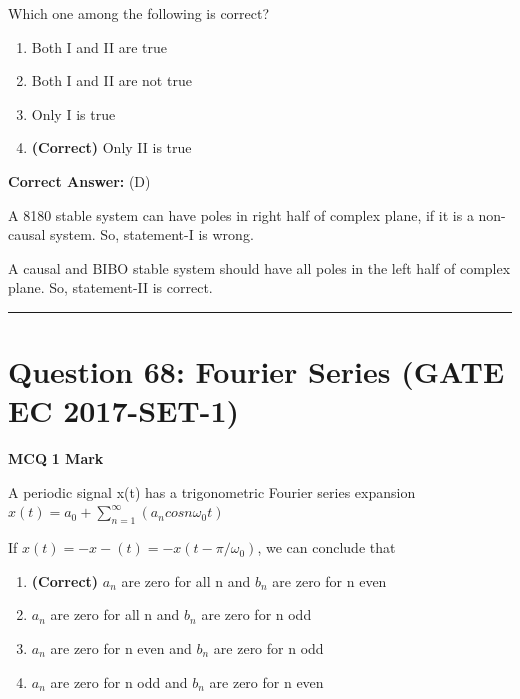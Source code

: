\documentclass[11pt,a4paper]{article}
\begin{document}
Which one among the following is correct?


\begin{enumerate}[label=(\Alph*)]
    \item Both I and II are true
    \item Both I and II are not true
    \item Only I is true
    \item \textbf{(Correct)} Only II is true
\end{enumerate}

\noindent \textbf{Correct Answer:} (D)

\begin{tcolorbox}[solbox, title=Detailed Solution -- Question 67]
A 8180 stable system can have poles in right
half of complex plane, if it is a non-causal
system. So, statement-I is wrong. 

A causal and BIBO stable system should have
all poles in the left half of complex plane. So,
statement-II is correct.
\end{tcolorbox}

\vspace{1.5em}
\hrule
\vspace{1.5em}

\section*{Question 68: Fourier Series (GATE EC 2017-SET-1)}
\noindent \textbf{\color{primary}MCQ} \hfill \textbf{\color{secondary}1 Mark}


\noindent A periodic signal x(t) has a trigonometric Fourier series expansion 
 $x(t)=a_{0}+\sum_{n=1}^{\infty}(a_{n}cosn\omega_{0}t)$ 
 
 If $x(t)=-x-(t)=-x(t-\pi/\omega_{0})$, we can conclude that


\begin{enumerate}[label=(\Alph*)]
    \item \textbf{(Correct)} $a_{n}$ are zero for all n and $b_{n}$ are zero for n even
    \item $a_{n}$ are zero for all n and $b_{n}$ are zero for n odd
    \item $a_{n}$ are zero for n even and $b_{n}$ are zero for n odd
    \item $a_{n}$ are zero for n odd and $b_{n}$ are zero for n even
\end{enumerate}
\end{document}
